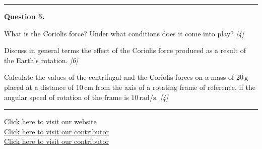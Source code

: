 \documentclass[11pt,a4paper]{article}
\newcommand{\pts}[1]{\hfill   \textit{[#1]}}
\begin{document}
\medskip\rule{\linewidth}{0.2pt}

\medskip


\noindent   \textbf{Question 5.}

\begin{parts}
  \item What is the Coriolis force? Under what conditions does it come into play? \pts{4}
  \item Discuss in general terms the effect of the Coriolis force produced as a result of the Earth's rotation. \pts{6}
  \item Calculate the values of the centrifugal and the Coriolis forces on a mass of $20\, \text{g}$ placed at a distance of $10\, \text{cm}$ from the axis of a rotating frame of reference, if the angular speed of rotation of the frame is $10\, \text{rad/s}$. \pts{4}
\end{parts}

\vfill
\rule{\linewidth}{0.4pt}

\begin{center}\small
  \href{https://bhu-exam.vercel.app/}{Click here to visit our website}\\[4pt]
  \href{https://me-aryan.vercel.app/}{Click here to visit our contributor}\\[4pt]
  \href{https://quashan-me.vercel.app/}{Click here to visit our contributor}
\end{center}
\end{document}
